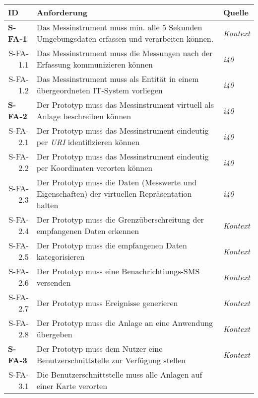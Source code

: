   \begin{tabularx}{\textwidth}{@{}lXp{2cm}@{}}
      \toprule
      ID                & Anforderung & Quelle \\
      \midrule
      \endhead
      \textbf{S-FA-1} \label{sfa1}             &  Das Messinstrument muss min. alle 5 Sekunden Umgebungsdaten erfassen und verarbeiten können.   &  \textit{Kontext}     \\
      \multicolumn{1}{r}{S-FA-1.1} &   Das Messinstrument muss die Messungen nach der Erfassung kommunizieren können & \textit{\ac{i40}}\\
      \multicolumn{1}{r}{S-FA-1.2} &   Das Messinstrument muss als Entität in einem übergeordneten IT-System vorliegen & \textit{\ac{i40}}\\
      \textbf{S-FA-2}              &   Der Prototyp muss das Messinstrument virtuell als Anlage beschreiben können & \textit{\ac{i40}}        \\
      \multicolumn{1}{r}{S-FA-2.1} &   Der Prototyp muss das Messinstrument eindeutig per \textit{URI} identifizieren können  & \textit{\ac{i40}}\\
      \multicolumn{1}{r}{S-FA-2.2} &   Der Prototyp muss das Messinstrument eindeutig per Koordinaten verorten können  & \textit{\ac{i40}}\\
      \multicolumn{1}{r}{S-FA-2.3} & Der Prototyp muss die Daten (Messwerte und Eigenschaften) der virtuellen Repräsentation halten  & \textit{\ac{i40}} \\
      \multicolumn{1}{r}{S-FA-2.4} & Der Prototyp muss die Grenzüberschreitung der empfangenen Daten erkennen &  \textit{Kontext}\\
      \multicolumn{1}{r}{S-FA-2.5} & Der Prototyp muss die empfangenen Daten kategorisieren &  \textit{Kontext}\\
      \multicolumn{1}{r}{S-FA-2.6} & Der Prototyp muss eine Benachrichtiungs-SMS versenden  &  \textit{Kontext}\\
      \multicolumn{1}{r}{S-FA-2.7} & Der Prototyp muss Ereignisse generieren  &  \textit{Kontext}\\
      \multicolumn{1}{r}{S-FA-2.8} & Der Prototyp muss die Anlage an eine Anwendung übergeben &  \textit{Kontext} \\
      \textbf{S-FA-3}              &  Der Prototyp muss dem Nutzer eine Benutzerschnittstelle zur Verfügung stellen    & \textit{Kontext}  \\
      \multicolumn{1}{r}{S-FA-3.1} &  Die Benutzerschnittstelle muss alle Anlagen auf einer Karte verorten \\

\end{tabularx}
